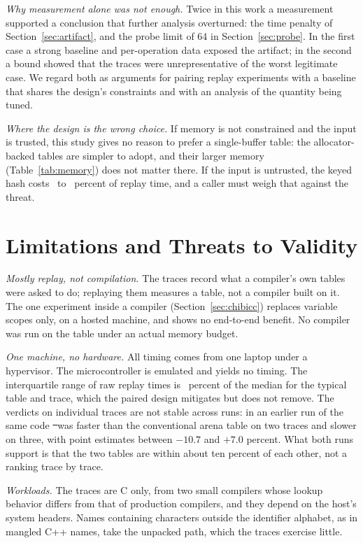 \emph{Why measurement alone was not enough.} Twice in this work a measurement supported a conclusion that further analysis overturned: the time penalty of Section~\ref{sec:artifact}, and the probe limit of 64 in Section~\ref{sec:probe}. In the first case a strong baseline and per-operation data exposed the artifact; in the second a bound showed that the traces were unrepresentative of the worst legitimate case. We regard both as arguments for pairing replay experiments with a baseline that shares the design's constraints and with an analysis of the quantity being tuned.

\emph{Where the design is the wrong choice.} If memory is not constrained and the input is trusted, this study gives no reason to prefer a single-buffer table: the allocator-backed tables are simpler to adopt, and their larger memory (Table~\ref{tab:memory}) does not matter there. If the input is untrusted, the keyed hash costs \KeyedLo\ to \KeyedHi\ percent of replay time, and a caller must weigh that against the threat.

\section{Limitations and Threats to Validity}
\label{sec:limits}

\emph{Mostly replay, not compilation.} The traces record what a compiler's own tables were asked to do; replaying them measures a table, not a compiler built on it. The one experiment inside a compiler (Section~\ref{sec:chibicc}) replaces variable scopes only, on a hosted machine, and shows no end-to-end benefit. No compiler was run on the table under an actual memory budget.

\emph{One machine, no hardware.} All timing comes from one laptop under a hypervisor. The microcontroller is emulated and yields no timing. The interquartile range of raw replay times is \IqrMedian\ percent of the median for the typical table and trace, which the paired design mitigates but does not remove. The verdicts on individual traces are not stable across runs: in an earlier run of the same code \st\ was faster than the conventional arena table on two traces and slower on three, with point estimates between $-10.7$ and $+7.0$ percent. What both runs support is that the two tables are within about ten percent of each other, not a ranking trace by trace.

\emph{Workloads.} The traces are C only, from two small compilers whose lookup behavior differs from that of production compilers, and they depend on the host's system headers. Names containing characters outside the identifier alphabet, as in mangled C++ names, take the unpacked path, which the traces exercise little.

